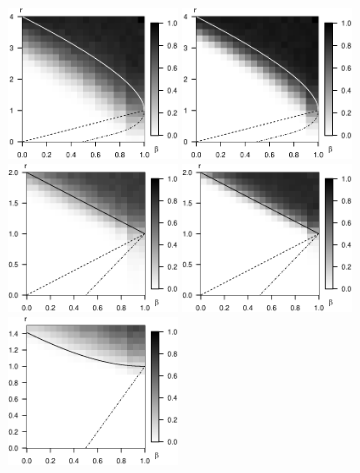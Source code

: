 \begin{figure}
      \centering
      \includegraphics[width=0.4\textwidth]{./figures/simulated_phase_diagram_p100.eps}
      \includegraphics[width=0.4\textwidth]{./figures/simulated_phase_diagram_p10000.eps}
      \includegraphics[width=0.4\textwidth]{./figures/simulated_phase_diagram_Laplace_p100_4.eps}
      \includegraphics[width=0.4\textwidth]{./figures/simulated_phase_diagram_Laplace_p10000_4.eps}
      \includegraphics[width=0.4\textwidth]{./figures/simulated_phase_diagram_NLC_p100.eps}

\end{figure}
